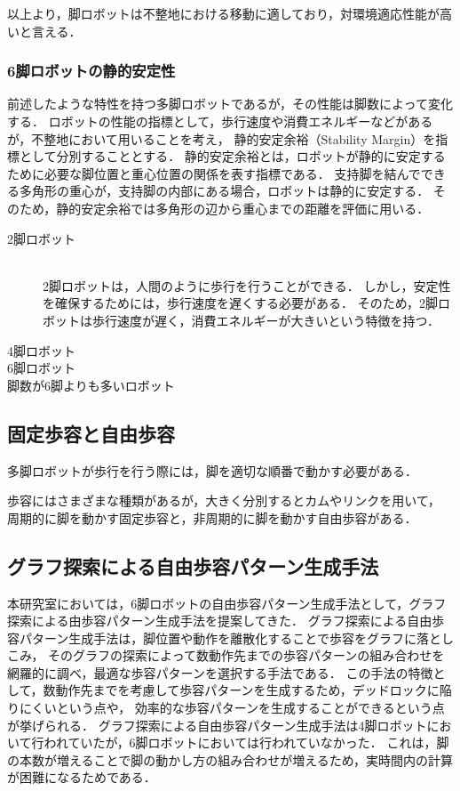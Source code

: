 以上より，脚ロボットは不整地における移動に適しており，対環境適応性能が高いと言える．

\subsubsection{6脚ロボットの静的安定性}
前述したような特性を持つ多脚ロボットであるが，その性能は脚数によって変化する．
ロボットの性能の指標として，歩行速度や消費エネルギーなどがあるが，不整地において用いることを考え，
静的安定余裕\cite{Hirose_Static_stability_criterion}（Stability Margin）を指標として分別することとする．
静的安定余裕とは，ロボットが静的に安定するために必要な脚位置と重心位置の関係を表す指標である．
支持脚を結んでできる多角形の重心が，支持脚の内部にある場合，ロボットは静的に安定する．
そのため，静的安定余裕では多角形の辺から重心までの距離を評価に用いる．
\begin{description}
  \item[2脚ロボット]\mbox{}\\
    2脚ロボットは，人間のように歩行を行うことができる．
    しかし，安定性を確保するためには，歩行速度を遅くする必要がある．
    そのため，2脚ロボットは歩行速度が遅く，消費エネルギーが大きいという特徴を持つ．
  \item[4脚ロボット]
  \item[6脚ロボット]
  \item[脚数が6脚よりも多いロボット] 
\end{description}

\subsection{固定歩容と自由歩容}
多脚ロボットが歩行を行う際には，脚を適切な順番で動かす必要がある．

歩容にはさまざまな種類があるが，大きく分別するとカムやリンクを用いて，
周期的に脚を動かす固定歩容と，非周期的に脚を動かす自由歩容がある．

\subsection{グラフ探索による自由歩容パターン生成手法}

本研究室においては，6脚ロボットの自由歩容パターン生成手法として，グラフ探索による由歩容パターン生成手法を提案してきた．
グラフ探索による自由歩容パターン生成手法は，脚位置や動作を離散化することで歩容をグラフに落としこみ，
そのグラフの探索によって数動作先までの歩容パターンの組み合わせを網羅的に調べ，最適な歩容パターンを選択する手法である．
この手法の特徴として，数動作先までを考慮して歩容パターンを生成するため，デッドロックに陥りにくいという点や，
効率的な歩容パターンを生成することができるという点が挙げられる．
グラフ探索による自由歩容パターン生成手法は4脚ロボットにおいて行われていたが\cite{Prabir_Graph_search}，6脚ロボットにおいては行われていなかった．
これは，脚の本数が増えることで脚の動かし方の組み合わせが増えるため，実時間内の計算が困難になるためである．

